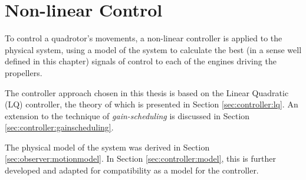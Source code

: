 \chapter{Non-linear Control}
\label{cha:controller}
    To control a quadrotor's movements, a non-linear controller is applied to the
    physical system, using a model of the system to calculate the best
    (in a sense well defined in this chapter) signals of control to each
    of the engines driving the propellers.

    The controller approach chosen in this thesis is based on the Linear Quadratic (LQ)
    controller, the theory of which is presented in Section \ref{sec:controller:lq}.
    An extension to the technique of \textit{gain-scheduling} is discussed
    in Section \ref{sec:controller:gainscheduling}.

    The physical model of the system was derived in Section \ref{sec:observer:motionmodel}.
    In Section \ref{sec:controller:model}, this is further developed
    and adapted for compatibility as a model for the controller.

    
    
    
